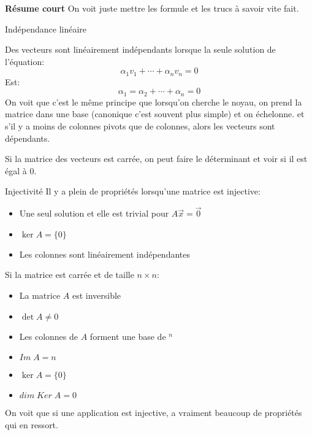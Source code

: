 \textbf{Résume court}
On voit juste mettre les formule et les trucs à savoir vite fait.\\
\begin{parag}{Indépendance linéaire}
    \begin{truc}
        Des vecteurs sont linéairement indépendants lorsque la seule solution de l'équation:
        \[\alpha_1v_1 + \cdots + \alpha_n v_n = 0\]
        Est:
        \[\alpha_1 = \alpha_2 + \cdots + \alpha_n = 0\]
        On voit que c'est le même principe que lorsqu’on cherche le noyau, on prend la matrice dans une base (canonique c'est souvent plus simple) et on échelonne. et s'il y a moins de colonnes pivots que de colonnes, alors les vecteurs sont dépendants.
        
    \end{truc}
    \begin{truc}
        Si la matrice des vecteurs est carrée, on peut faire le déterminant et voir si il est égal à 0.
    \end{truc}
    
    
\end{parag}


\begin{parag}{Injectivité}
    Il y a plein de propriétés lorsqu'une matrice est injective:
    \begin{truc}
        \begin{itemize}
            \item Une seul solution et elle est trivial pour $A\vec{x} = \vec{0}$
            \item $\ker A = \{0\}$
            \item Les colonnes sont linéairement indépendantes
        \end{itemize}
        Si la matrice est carrée et de taille $n \times n$:
        \begin{itemize}
            \item La matrice $A$ est inversible
            \item $\det A \neq 0$
            \item Les colonnes de $A$ forment une base de \R$^n$
            \item $Im\; A = n$
            \item $\ker A = \{0\}$
            \item $dim\; Ker\; A = 0$
        \end{itemize}
    \end{truc}
    On voit que si une application est injective, a vraiment beaucoup de propriétés qui en ressort.
\end{parag}

